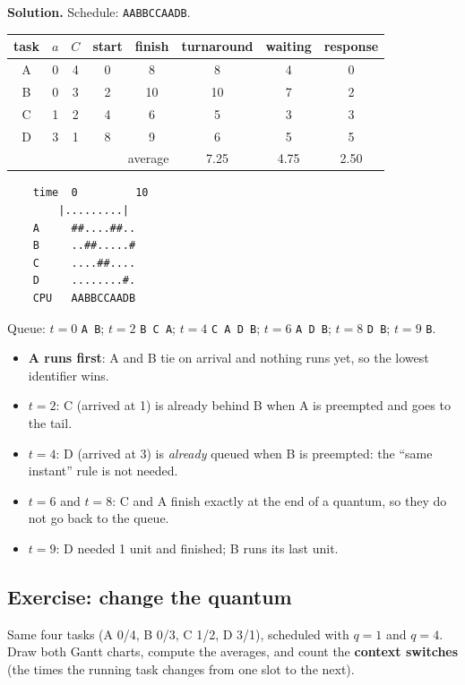 \textbf{Solution.} Schedule: \texttt{AABBCCAADB}.
\begin{center}
    \begin{tabular}{c c c | c c c c c}
        \hline
        task & $a$ & $C$ & start & finish & turnaround & waiting & response \\
        \hline
        A & 0 & 4 & 0 & 8 & 8 & 4 & 0 \\
        B & 0 & 3 & 2 & 10 & 10 & 7 & 2 \\
        C & 1 & 2 & 4 & 6 & 5 & 3 & 3 \\
        D & 3 & 1 & 8 & 9 & 6 & 5 & 5 \\
        \hline
        \multicolumn{5}{r}{average} & 7.25 & 4.75 & 2.50 \\
    \end{tabular}
\end{center}

\begin{verbatim}
    time  0         10
        |.........|
    A     ##....##..
    B     ..##.....#
    C     ....##....
    D     ........#.
    CPU   AABBCCAADB
\end{verbatim}

Queue: $t=0$ \texttt{A B}; $t=2$ \texttt{B C A}; $t=4$ \texttt{C A D B}; $t=6$ \texttt{A D B}; $t=8$ \texttt{D B}; $t=9$ \texttt{B}.
\begin{itemize}
    \item \textbf{A runs first}: A and B tie on arrival and nothing runs yet, so the lowest identifier wins.
    \item $t=2$: C (arrived at 1) is already behind B when A is preempted and goes to the tail.
    \item $t=4$: D (arrived at 3) is \emph{already} queued when B is preempted: the ``same instant'' rule is not needed.
    \item $t=6$ and $t=8$: C and A finish exactly at the end of a quantum, so they do not go back to the queue.
    \item $t=9$: D needed 1 unit and finished; B runs its last unit.
\end{itemize}

\subsection{Exercise: change the quantum}
Same four tasks (A 0/4, B 0/3, C 1/2, D 3/1), scheduled with $q=1$ and $q=4$. Draw both Gantt charts, compute the averages, and count the \textbf{context switches} (the times the running task changes from one slot to the next).

